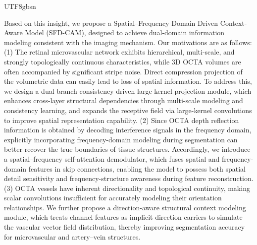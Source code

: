 \documentclass[times, review, 10pt]{elsarticle}
\begin{document}
\begin{CJK}{UTF8}{gbsn}
\par
Based on this insight, we propose a Spatial–Frequency Domain Driven Context-Aware Model (SFD-CAM), designed to achieve dual-domain information modeling consistent with the imaging mechanism. Our motivations are as follows: (1) The retinal microvascular network exhibits hierarchical, multi-scale, and strongly topologically continuous characteristics, while 3D OCTA volumes are often accompanied by significant stripe noise. Direct compression projection of the volumetric data can easily lead to loss of spatial information. To address this, we design a dual-branch consistency-driven large-kernel projection module, which enhances cross-layer structural dependencies through multi-scale modeling and consistency learning, and expands the receptive field via large-kernel convolutions to improve spatial representation capability. (2) Since OCTA depth reflection information is obtained by decoding interference signals in the frequency domain, explicitly incorporating frequency-domain modeling during segmentation can better recover the true boundaries of tissue structures. Accordingly, we introduce a spatial–frequency self-attention demodulator, which fuses spatial and frequency-domain features in skip connections, enabling the model to possess both spatial detail sensitivity and frequency-structure awareness during feature reconstruction. (3) OCTA vessels have inherent directionality and topological continuity, making scalar convolutions insufficient for accurately modeling their orientation relationships. We further propose a direction-aware structural context modeling module, which treats channel features as implicit direction carriers to simulate the vascular vector field distribution, thereby improving segmentation accuracy for microvascular and artery–vein structures.
\par



\end{CJK}
\end{document}
